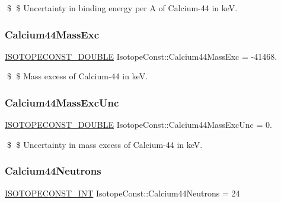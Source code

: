 \$ \$ Uncertainty in binding energy per A of Calcium-\/44 in keV. \mbox{\label{group___isotope_const-_calcium-_ca44_gaef13ce11724415096301cc6f36e69dec}} 
\subsubsection{\texorpdfstring{Calcium44\+Mass\+Exc}{Calcium44MassExc}}
{\footnotesize\ttfamily \mbox{\hyperlink{group___isotope_const-_macros_ga8f45a7272ce02c0b4c65c44636ed719a}{I\+S\+O\+T\+O\+P\+E\+C\+O\+N\+S\+T\+\_\+\+D\+O\+U\+B\+LE}} Isotope\+Const\+::\+Calcium44\+Mass\+Exc = -\/41468.}

\$ \$ Mass excess of Calcium-\/44 in keV. \mbox{\label{group___isotope_const-_calcium-_ca44_gaf11618891faf8be05a987027e7d49f24}} 
\subsubsection{\texorpdfstring{Calcium44\+Mass\+Exc\+Unc}{Calcium44MassExcUnc}}
{\footnotesize\ttfamily \mbox{\hyperlink{group___isotope_const-_macros_ga8f45a7272ce02c0b4c65c44636ed719a}{I\+S\+O\+T\+O\+P\+E\+C\+O\+N\+S\+T\+\_\+\+D\+O\+U\+B\+LE}} Isotope\+Const\+::\+Calcium44\+Mass\+Exc\+Unc = 0.}

\$ \$ Uncertainty in mass excess of Calcium-\/44 in keV. \mbox{\label{group___isotope_const-_calcium-_ca44_ga48d9f4f514e9c8116cafd4839502394c}} 
\subsubsection{\texorpdfstring{Calcium44\+Neutrons}{Calcium44Neutrons}}
{\footnotesize\ttfamily \mbox{\hyperlink{group___isotope_const-_macros_ga5f18360b3e99483a35c32d789e62621c}{I\+S\+O\+T\+O\+P\+E\+C\+O\+N\+S\+T\+\_\+\+I\+NT}} Isotope\+Const\+::\+Calcium44\+Neutrons = 24}

